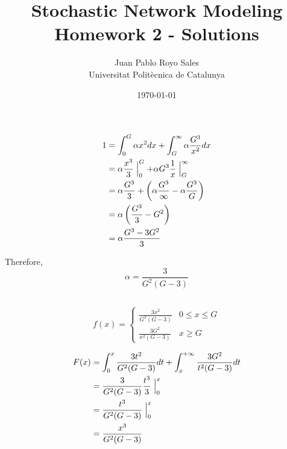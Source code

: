 \documentclass[12pt, a4paper]{article}
\title{%
  Stochastic Network Modeling \\
  Homework 2 - Solutions
}
\author{%
  Juan Pablo Royo Sales\\
  \small{Universitat Politècnica de Catalunya}
}
\date\today
\begin{document}
\maketitle

\section{}
\subsection{}

\begin{subequations}
  \begin{align}
    1 &= \int_0^G \alpha x^2 dx + \int_G^{\infty} \alpha \frac{G^3}{x^2} dx\\
      &= \alpha \frac{x^3}{3}\Bigm|_0^G + \alpha G^3 \frac{1}{x}\Bigm|_G^{\infty}\\
      &= \alpha \frac{G^3}{3} + \left(\alpha \frac{G^3}{\infty} - \alpha \frac{G^3}{G}\right)\\
      &= \alpha \left(\frac{G^3}{3} - G^2\right)\\
      &= \alpha \frac{G^3 - 3G^2}{3}\\
  \end{align}
\end{subequations}

Therefore, 
\begin{equation*}
  \alpha = \frac{3}{G^2(G - 3)}
\end{equation*}

\subsection{}

\[
  f(x) = \begin{cases}
          \frac{3x^2}{G^2(G - 3)} & 0 \leq x \leq G\\
          \frac{3G^2}{x^2(G - 3)} & x \geq G
          \end{cases}
\]

\begin{subequations}
  \begin{align}
    F(x) &= \int_0^x \frac{3t^2}{G^2(G - 3)} dt + \int_x^{+\infty} \frac{3G^2}{t^2(G - 3)} dt\\
         &= \frac{3}{G^2(G - 3)}\frac{t^3}{3}\Bigm|_0^x\\
         &= \frac{t^3}{G^2(G - 3)}\Bigm|_0^x\\
         &= \frac{x^3}{G^2(G - 3)}
  \end{align}
\end{subequations}
\end{document}
